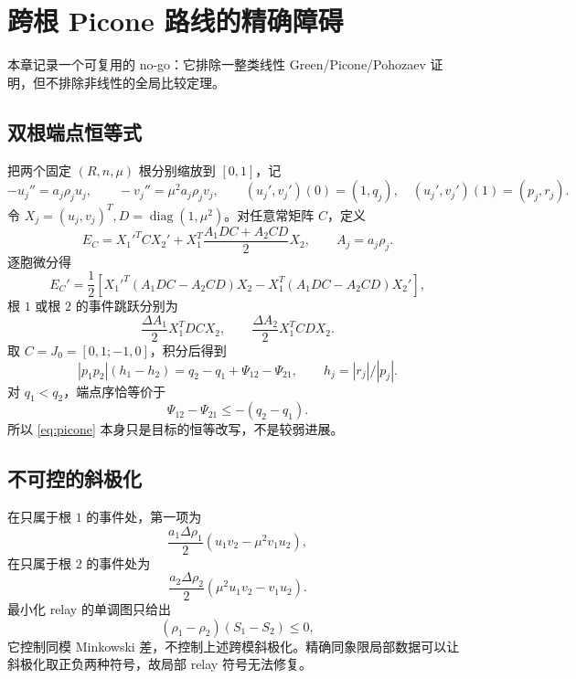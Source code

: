 \documentclass[UTF8,12pt,openany,fontset=fandol]{ctexrep}
\theoremstyle{definition}
\newcommand{\diag}{\operatorname{diag}}
\begin{document}
\chapter{跨根 Picone 路线的精确障碍}

本章记录一个可复用的 no-go：它排除一整类线性 Green/Picone/Pohozaev 证明，但不排除非线性的全局比较定理。

\section{双根端点恒等式}

把两个固定 $(R,n,\mu)$ 根分别缩放到 $[0,1]$，记
\begin{equation}
 -u_j''=a_j\rho_ju_j,\qquad -v_j''=\mu^2a_j\rho_jv_j,\qquad
 (u_j',v_j')(0)=(1,q_j),\quad (u_j',v_j')(1)=(p_j,r_j).
\end{equation}
令 $X_j=(u_j,v_j)^T,D=\diag(1,\mu^2)$。对任意常矩阵 $C$，定义
\begin{equation}
 E_C=X_1'^TCX_2'+X_1^T\frac{A_1DC+A_2CD}{2}X_2,\qquad A_j=a_j\rho_j.
\end{equation}
逐胞微分得
\begin{equation}
 E_C'=\frac12\left[X_1'^T(A_1DC-A_2CD)X_2
 -X_1^T(A_1DC-A_2CD)X_2'\right],
\end{equation}
根 $1$ 或根 $2$ 的事件跳跃分别为
\begin{equation}
 \frac{\Delta A_1}{2}X_1^TDCX_2,\qquad
 \frac{\Delta A_2}{2}X_1^TCDX_2.
\end{equation}
取 $C=J_0=[0,1;-1,0]$，积分后得到
\begin{equation}\label{eq:picone}
 |p_1p_2|(h_1-h_2)=q_2-q_1+\Psi_{12}-\Psi_{21},\qquad
 h_j=|r_j|/|p_j|.
\end{equation}
对 $q_1<q_2$，端点序恰等价于
\begin{equation}
 \Psi_{12}-\Psi_{21}\le-(q_2-q_1).
\end{equation}
所以 \eqref{eq:picone} 本身只是目标的恒等改写，不是较弱进展。

\section{不可控的斜极化}

在只属于根 $1$ 的事件处，第一项为
\begin{equation}
 \frac{a_1\Delta\rho_1}{2}(u_1v_2-\mu^2v_1u_2),
\end{equation}
在只属于根 $2$ 的事件处为
\begin{equation}
 \frac{a_2\Delta\rho_2}{2}(\mu^2u_1v_2-v_1u_2).
\end{equation}
最小化 relay 的单调图只给出
\begin{equation}
 (\rho_1-\rho_2)(S_1-S_2)\le0,
\end{equation}
它控制同模 Minkowski 差，不控制上述跨模斜极化。精确同象限局部数据可以让斜极化取正负两种符号，故局部 relay 符号无法修复。
\end{document}
